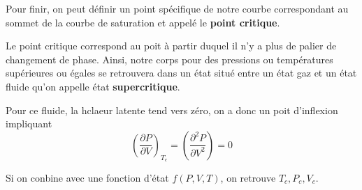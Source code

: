  Pour finir, on peut définir un point spécifique de notre courbe correspondant au sommet de la courbe de saturation et appelé le \textbf{point critique}.\\
 
 \begin{definition}
 Le point critique correspond au poit à partir duquel il n'y a plus de palier de changement de phase. Ainsi, notre corps pour des pressions ou températures supérieures ou égales se retrouvera dans un état situé entre un état gaz et un état fluide qu'on appelle état \textbf{supercritique}.
 \end{definition}
 
 Pour ce fluide, la hclaeur latente tend vers zéro, on a donc un poit d'inflexion impliquant
 $$\left ( \frac{\partial P}{\partial V}\right ) _{T_c}=\left ( \frac{\partial ^2 P}{\partial V^2} \right ) = 0$$
 
 Si on conbine avec une fonction d'état $f(P,V,T)$, on retrouve $T_c, P_c, V_c$.
 
